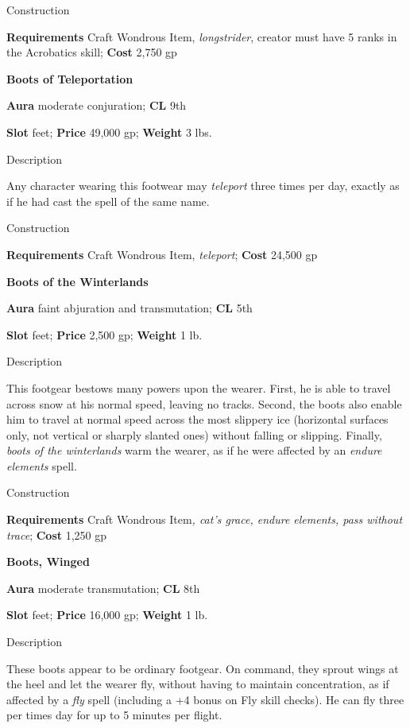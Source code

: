 Construction
				
\textbf{Requirements} Craft Wondrous Item, \textit{longstrider}, creator must have 5 ranks in the Acrobatics skill; \textbf{Cost }2,750 gp
				
\textbf{Boots of Teleportation}
				
\textbf{Aura} moderate conjuration;\textbf{ CL }9th
				
\textbf{Slot} feet; \textbf{Price} 49,000 gp; \textbf{Weight} 3 lbs.
				
Description
				
Any character wearing this footwear may \textit{teleport }three times per day, exactly as if he had cast the spell of the same name. 
				
Construction
				
\textbf{Requirements} Craft Wondrous Item, \textit{teleport}; \textbf{Cost }24,500 gp
				
\textbf{Boots of the Winterlands}
				
\textbf{Aura} faint abjuration and transmutation;\textbf{ CL }5th
				
\textbf{Slot} feet; \textbf{Price} 2,500 gp; \textbf{Weight} 1 lb.
				
Description
				
This footgear bestows many powers upon the wearer. First, he is able to travel across snow at his normal speed, leaving no tracks. Second, the boots also enable him to travel at normal speed across the most slippery ice (horizontal surfaces only, not vertical or sharply slanted ones) without falling or slipping. Finally, \textit{boots of the winterlands }warm the wearer, as if he were affected by an \textit{endure elements }spell. 
				
Construction
				
\textbf{Requirements} Craft Wondrous Item\textit{, cat's grace, endure elements, pass without trace}; \textbf{Cost }1,250 gp
				
\textbf{Boots, Winged}
				
\textbf{Aura} moderate transmutation;\textbf{ CL }8th
				
\textbf{Slot} feet; \textbf{Price} 16,000 gp; \textbf{Weight} 1 lb.
				
Description
				
These boots appear to be ordinary footgear. On command, they sprout wings at the heel and let the wearer fly, without having to maintain concentration, as if affected by a \textit{fly }spell (including a +4 bonus on Fly skill checks). He can fly three per times day for up to 5 minutes per flight.
				

